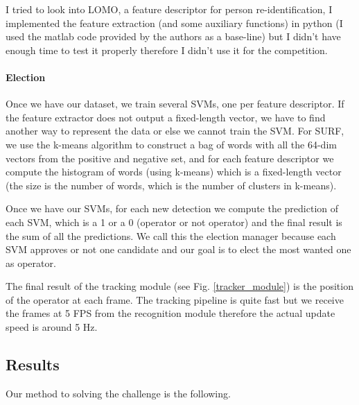 \documentclass[a4paper, twocolumn]{article}
\begin{document}
    I tried to look into LOMO\cite{2014arXiv1406.4216L}, a feature descriptor for person re-identification, I implemented the feature extraction (and some auxiliary functions) in python (I used the matlab code provided by the authors as a base-line) but I didn't have enough time to test it properly therefore I didn't use it for the competition.
    
    \paragraph{Election} Once we have our dataset, we train several SVMs, one per feature descriptor. If the feature extractor does not output a fixed-length vector, we have to find another way to represent the data or else we cannot train the SVM. For SURF, we use the k-means algorithm to construct a bag of words with all the 64-dim vectors from the positive and negative set, and for each feature descriptor we compute the histogram of words (using k-means) which is a fixed-length vector (the size is the number of words, which is the number of clusters in k-means).
    
    Once we have our SVMs, for each new detection we compute the prediction of each SVM, which is a 1 or a 0 (operator or not operator) and the final result is the sum of all the predictions. We call this the election manager because each SVM approves or not one candidate and our goal is to elect the most wanted one as operator.
    
    The final result of the tracking module (see Fig. \ref{tracker_module}) is the position of the operator at each frame. The tracking pipeline is quite fast but we receive the frames at 5 FPS from the recognition module therefore the actual update speed is around 5 Hz.
    
    \subsection{Results}
    
    Our method to solving the challenge is the following.
    
\end{document}
